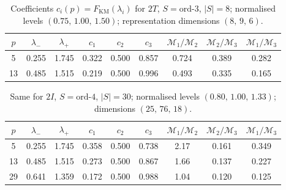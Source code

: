\documentclass[12pt, a4paper]{article}
\theoremstyle{plain}
\theoremstyle{definition}
\theoremstyle{remark}
\begin{document}
      \begin{table}[h]
        \centering
        \caption{Coefficients $c_i(p) = F_{\mathrm{KM}}(\lambda_i)$ for
          $2T$, $S=\mathrm{ord}\text{-}3$, $|S|=8$;
          normalised levels $(0.75,\,1.00,\,1.50)$;
          representation dimensions $(8,\,9,\,6)$.}
        \label{tab:ci-2T}
        \begin{tabular}{@{}ccccccccc@{}}
          \toprule
          $p$ & $\lambda_-$ & $\lambda_+$ & $c_1$ & $c_2$ & $c_3$
          & $\mathcal{M}_1/\mathcal{M}_2$
          & $\mathcal{M}_2/\mathcal{M}_3$
          & $\mathcal{M}_1/\mathcal{M}_3$ \\
          \midrule
          5 & 0.255 & 1.745 & 0.322 & 0.500 & 0.857 & 0.724 & 0.389 & 0.282 \\
          13 & 0.485 & 1.515 & 0.219 & 0.500 & 0.996 & 0.493 & 0.335 & 0.165 \\
          \bottomrule
        \end{tabular}
      \end{table}

      \begin{table}[h]
        \centering
        \caption{Same for $2I$, $S=\mathrm{ord}\text{-}4$, $|S|=30$;
        normalised levels $(0.80,\,1.00,\,1.33)$;
        dimensions $(25,\,76,\,18)$.}
        \label{tab:ci-2I4}
        \begin{tabular}{@{}ccccccccc@{}}
          \toprule
          $p$ & $\lambda_-$ & $\lambda_+$ & $c_1$ & $c_2$ & $c_3$
          & $\mathcal{M}_1/\mathcal{M}_2$
          & $\mathcal{M}_2/\mathcal{M}_3$
          & $\mathcal{M}_1/\mathcal{M}_3$ \\
          \midrule
          5 & 0.255 & 1.745 & 0.358 & 0.500 & 0.738 & 2.17  & 0.161 & 0.349 \\
          13 & 0.485 & 1.515 & 0.273 & 0.500 & 0.867 & 1.66  & 0.137 & 0.227 \\
          29 & 0.641 & 1.359 & 0.172 & 0.500 & 0.988 & 1.04  & 0.120 & 0.125 \\
          \bottomrule
        \end{tabular}
      \end{table}
\end{document}
